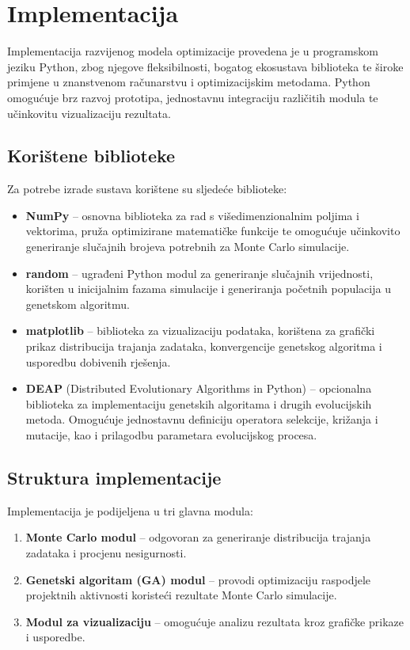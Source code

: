 \section{Implementacija}

Implementacija razvijenog modela optimizacije provedena je u programskom jeziku Python, zbog njegove fleksibilnosti, bogatog ekosustava biblioteka te široke primjene u znanstvenom računarstvu i optimizacijskim metodama. Python omogućuje brz razvoj prototipa, jednostavnu integraciju različitih modula te učinkovitu vizualizaciju rezultata.

\subsection{Korištene biblioteke}

Za potrebe izrade sustava korištene su sljedeće biblioteke:
\begin{itemize}
    \item \textbf{NumPy} -- osnovna biblioteka za rad s višedimenzionalnim poljima i vektorima, pruža optimizirane matematičke funkcije te omogućuje učinkovito generiranje slučajnih brojeva potrebnih za Monte Carlo simulacije.
    \item \textbf{random} -- ugrađeni Python modul za generiranje slučajnih vrijednosti, korišten u inicijalnim fazama simulacije i generiranja početnih populacija u genetskom algoritmu.
    \item \textbf{matplotlib} -- biblioteka za vizualizaciju podataka, korištena za grafički prikaz distribucija trajanja zadataka, konvergencije genetskog algoritma i usporedbu dobivenih rješenja.
    \item \textbf{DEAP} (Distributed Evolutionary Algorithms in Python) -- opcionalna biblioteka za implementaciju genetskih algoritama i drugih evolucijskih metoda. Omogućuje jednostavnu definiciju operatora selekcije, križanja i mutacije, kao i prilagodbu parametara evolucijskog procesa.
\end{itemize}

\subsection{Struktura implementacije}

Implementacija je podijeljena u tri glavna modula:
\begin{enumerate}
    \item \textbf{Monte Carlo modul} -- odgovoran za generiranje distribucija trajanja zadataka i procjenu nesigurnosti.
    \item \textbf{Genetski algoritam (GA) modul} -- provodi optimizaciju raspodjele projektnih aktivnosti koristeći rezultate Monte Carlo simulacije.
    \item \textbf{Modul za vizualizaciju} -- omogućuje analizu rezultata kroz grafičke prikaze i usporedbe.
\end{enumerate}

